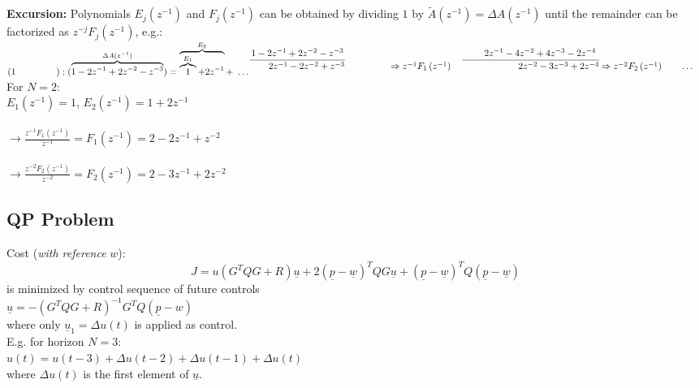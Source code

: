 \documentclass[english]{latex4ei/latex4ei_sheet}
\begin{document}
\begin{sectionbox}
\textbf{Excursion:}
Polynomials $E_{j}\left(z^{-1}\right)$ and $F_{j}\left(z^{-1}\right)$ can be obtained by dividing $1$ by $\tilde{A}(z^{-1})=\Delta A(z^{-1})$ until the remainder can be factorized as $z^{-j}F_{j}(z^{-1})$, e.g.:\\
\( \begin{aligned} (1 \qquad \ \qquad):(\overbrace{1-2z^{-1}+2z^{-2}-z^{-3}}^{\Delta A(z^{-1})})=\overbrace{\overbrace{1}^{E_1}+2z^{-1}}^{E_2}+\ \ldots \end{aligned}\\
\begin{aligned}
\frac{1-2 z^{-1}+2 z^{-2}-z^{-3}}{\qquad 2 z^{-1}-2 z^{-2}+z^{-3}} &  \textcolor{white}{\frac{}{\ \ \qquad \qquad \textcolor{black}{\Rightarrow z^{-1} F_{1}\left(z^{-1}\right)}}}
\end{aligned}\\
\begin{aligned}
\frac{\qquad 2 z^{-1}-4 z^{-2}+4 z^{-3}-2 z^{-4}}{\qquad \qquad \qquad 2z^{-2}- 3z^{-3}+2 z^{-4}} & \textcolor{white}{\frac{}{\textcolor{black}{\Rightarrow z^{-2} F_{2}\left(z^{-1}\right)\qquad\ldots}}} \end{aligned} \)
\\
For $N=2$:\\
$E_1(z^{-1})=1$, \quad $E_2(z^{-1})=1+2z^{-1}$\\
\\
$\rightarrow\frac{z^{-1}F_1(z^{-1})}{z^{-1}}=F_1(z^{-1})=2 -2z^{-1}+z^{-2}$\\
\\
$\rightarrow\frac{z^{-2}F_2(z^{-1})}{z^{-2}}=F_2(z^{-1})=2 -3z^{-1}+2z^{-2}$\\

\subsection{QP Problem}
Cost (\textit{with reference} $w$): $$J=u\left(G^{T} Q G+R\right) \underline{u}+2(\underline{p}-\underline{w})^{T} Q G \underline{u}+(\underline{p}-\underline{w})^{T} Q(\underline{p}-\underline{w})$$ is minimized by control sequence of future controls \\
$\underline{u}=-\left(G^{T} Q G+R\right)^{-1} G^{T} Q(\underline{p}-w)$\\
where only $\underline{u}_{1}=\Delta u(t)$ is applied as control.
\vspace{0.1cm}\\
E.g. for horizon $N=3$:\\ $u(t)=u(t-3)+\Delta u(t-2)+\Delta u(t-1)+\Delta u(t)$\\
where $\Delta u(t)$ is the first element of $\underline{u}$.

\end{sectionbox}
\end{document}
